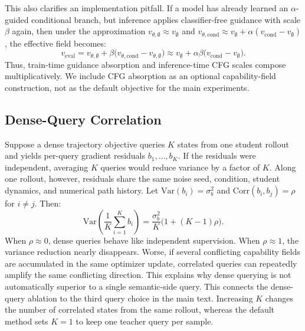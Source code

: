This also clarifies an implementation pitfall. If a model has already learned an $\alpha$-guided conditional branch, but inference applies classifier-free guidance with scale $\beta$ again, then under the approximation $v_{\theta,\emptyset}\approx v_{\emptyset}$ and $v_{\theta,\mathrm{cond}}\approx v_{\emptyset}+\alpha(v_{\mathrm{cond}}-v_{\emptyset})$, the effective field becomes:
\begin{equation}
  v_{\mathrm{eval}}
  =
  v_{\theta,\emptyset}
  +\beta\bigl(v_{\theta,\mathrm{cond}}-v_{\theta,\emptyset}\bigr)
  \approx
  v_{\emptyset}
  +\alpha\beta\bigl(v_{\mathrm{cond}}-v_{\emptyset}\bigr).
  \label{eq:app-cfg-compose}
\end{equation}
Thus, train-time guidance absorption and inference-time CFG scales compose multiplicatively. We include CFG absorption as an optional capability-field construction, not as the default objective for the main experiments.


\vspace{0.2cm}


\subsection{Dense-Query Correlation}
\label{app:dense-correlation}

Suppose a dense trajectory objective queries $K$ states from one student rollout and yields per-query gradient residuals $b_1,\ldots,b_K$. If the residuals were independent, averaging $K$ queries would reduce variance by a factor of $K$. Along one rollout, however, residuals share the same noise seed, condition, student dynamics, and numerical path history. Let $\mathrm{Var}(b_i)=\sigma_b^2$ and $\mathrm{Corr}(b_i,b_j)=\rho$ for $i\ne j$. Then:
\begin{equation}
  \mathrm{Var}\!\left(\frac{1}{K}\sum_{i=1}^K b_i\right)
  =
  \frac{\sigma_b^2}{K}\bigl(1+(K-1)\rho\bigr).
  \label{eq:app-corr-var}
\end{equation}
When $\rho\approx0$, dense queries behave like independent supervision. When $\rho\approx1$, the variance reduction nearly disappears. Worse, if several conflicting capability fields are accumulated in the same optimizer update, correlated queries can repeatedly amplify the same conflicting direction. This explains why dense querying is not automatically superior to a single semantic-side query. This connects the dense-query ablation to the third query choice in the main text. Increasing $K$ changes the number of correlated states from the same rollout, whereas the default method sets $K{=}1$ to keep one teacher query per sample.


